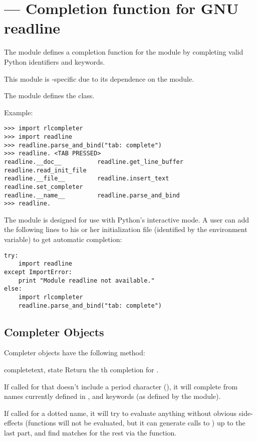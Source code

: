 \section{ ---
         Completion function for GNU readline}


The  module defines a completion function for
the  module by completing valid Python identifiers
and keywords.

This module is \UNIX-specific due to its dependence on the
 module.

The  module defines the  class.

Example:

\begin{verbatim}
>>> import rlcompleter
>>> import readline
>>> readline.parse_and_bind("tab: complete")
>>> readline. <TAB PRESSED>
readline.__doc__          readline.get_line_buffer  readline.read_init_file
readline.__file__         readline.insert_text      readline.set_completer
readline.__name__         readline.parse_and_bind
>>> readline.
\end{verbatim}

The  module is designed for use with Python's
interactive mode.  A user can add the following lines to his or her
initialization file (identified by the 
environment variable) to get automatic  completion:

\begin{verbatim}
try:
    import readline
except ImportError:
    print "Module readline not available."
else:
    import rlcompleter
    readline.parse_and_bind("tab: complete")
\end{verbatim}


\subsection{Completer Objects \label{completer-objects}}

Completer objects have the following method:

\begin{methoddesc}[Completer]{complete}{text, state}
Return the th completion for .

If called for  that doesn't include a period character
(), it will complete from names currently defined in
,  and
keywords (as defined by the  module).

If called for a dotted name, it will try to evaluate anything without
obvious side-effects (functions will not be evaluated, but it
can generate calls to ) up to the last part, and
find matches for the rest via the  function.
\end{methoddesc}
